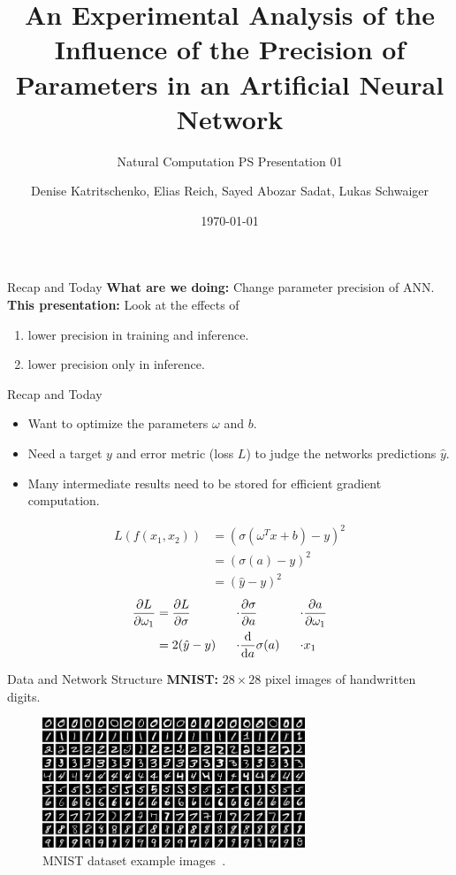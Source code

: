 \documentclass[aspectratio=169]{beamer} %
\title{An Experimental Analysis of the Influence of the Precision of Parameters in an Artificial Neural Network}
\subtitle{Natural Computation PS Presentation 01}
\author[D. K., E. R., S. A. S., L. S.]{Denise Katritschenko, Elias Reich, Sayed Abozar Sadat, Lukas Schwaiger}
\institute[\plusshort]{\pluslong\\ Department of Artificial Intelligence and Human Interfaces (AIHI)}
\date[\today]{\today}
\begin{document}
\frame{\titlepage}

\begin{frame}{Recap and Today}
  \textbf{What are we doing:} Change parameter precision of ANN.\\
  \vspace{0.5cm}
  \textbf{This presentation:} Look at the effects of
  \begin{enumerate}
    \item lower precision in training and inference.
    \item lower precision only in inference.
  \end{enumerate}
\end{frame}

\begin{frame}{Recap and Today}
  \begin{itemize}
    \item Want to optimize the parameters $\omega$ and $b$.
    \item Need a target $y$ and error metric (loss $L$) to judge the networks predictions
          $\hat y$.
    \item Many intermediate results need to be stored for efficient gradient computation.
  \end{itemize}

  \begin{align*}
    L(f(x_1, x_2)) & = (\sigma(\omega^T x + b) - y) ^2 \\
                   & = (\sigma(a) - y) ^ 2             \\
                   & = (\hat y - y) ^ 2
  \end{align*}
  \begin{alignat*}{3}
    \pdv{L}{\omega_1} & = \pdv{L}{\sigma} & \cdot & \pdv{\sigma}{a}      & \cdot & \pdv{a}{\omega_1} \\
                      & = 2(\hat y - y)~~ & \cdot & \odv{}{a}\sigma(a)~~ & \cdot & x_1
  \end{alignat*}
\end{frame}

\begin{frame}{Data and Network Structure}
  \textbf{MNIST:} $28 \times 28$ pixel images of handwritten digits.

  \begin{figure}
    \includegraphics[width=0.7\textwidth]{figures/mnist.png}
    \caption{MNIST dataset example images~\cite{mnistImage}.}
  \end{figure}
\end{frame}
\end{document}

